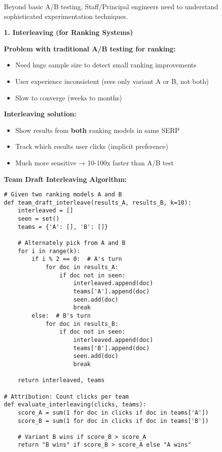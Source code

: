 \documentclass[10pt]{article}
\begin{document}
Beyond basic A/B testing, Staff/Principal engineers need to understand sophisticated experimentation techniques.

\textbf{1. Interleaving (for Ranking Systems)}

\textbf{Problem with traditional A/B testing for ranking:}
\begin{itemize}
\item Need huge sample size to detect small ranking improvements
\item User experience inconsistent (sees only variant A or B, not both)
\item Slow to converge (weeks to months)
\end{itemize}

\textbf{Interleaving solution:}
\begin{itemize}
\item Show results from \textbf{both} ranking models in same SERP
\item Track which results user clicks (implicit preference)
\item Much more sensitive → 10-100x faster than A/B test
\end{itemize}

\textbf{Team Draft Interleaving Algorithm:}
\begin{verbatim}
# Given two ranking models A and B
def team_draft_interleave(results_A, results_B, k=10):
    interleaved = []
    seen = set()
    teams = {'A': [], 'B': []}

    # Alternately pick from A and B
    for i in range(k):
        if i % 2 == 0:  # A's turn
            for doc in results_A:
                if doc not in seen:
                    interleaved.append(doc)
                    teams['A'].append(doc)
                    seen.add(doc)
                    break
        else:  # B's turn
            for doc in results_B:
                if doc not in seen:
                    interleaved.append(doc)
                    teams['B'].append(doc)
                    seen.add(doc)
                    break

    return interleaved, teams

# Attribution: Count clicks per team
def evaluate_interleaving(clicks, teams):
    score_A = sum(1 for doc in clicks if doc in teams['A'])
    score_B = sum(1 for doc in clicks if doc in teams['B'])

    # Variant B wins if score_B > score_A
    return "B wins" if score_B > score_A else "A wins"
\end{verbatim}
\end{document}

